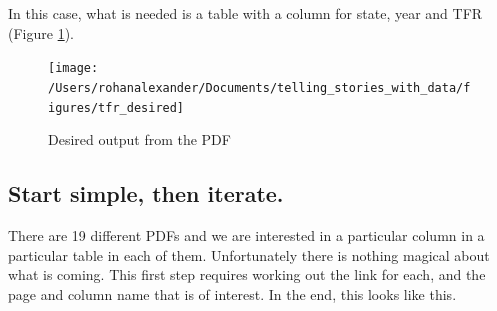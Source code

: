 \documentclass[
]{book}
\newenvironment{Shaded}{\begin{snugshade}}{\end{snugshade}}
\newcommand{\KeywordTok}[1]{\textcolor[rgb]{0.13,0.29,0.53}{\textbf{#1}}}
\newcommand{\NormalTok}[1]{#1}
\newcommand{\OperatorTok}[1]{\textcolor[rgb]{0.81,0.36,0.00}{\textbf{#1}}}
\newcommand{\StringTok}[1]{\textcolor[rgb]{0.31,0.60,0.02}{#1}}
\begin{document}
In this case, what is needed is a table with a column for state, year and TFR (Figure \ref{fig:tfrdesired}).

\begin{figure}
\texttt{[image: /Users/rohanalexander/Documents/telling\_stories\_with\_data/figures/tfr\_desired]} \caption{Desired output from the PDF}\label{fig:tfrdesired}
\end{figure}

\hypertarget{start-simple-then-iterate.}{%
\subsection{Start simple, then iterate.}\label{start-simple-then-iterate.}}

There are 19 different PDFs and we are interested in a particular column in a particular table in each of them. Unfortunately there is nothing magical about what is coming. This first step requires working out the link for each, and the page and column name that is of interest. In the end, this looks like this.

\begin{Shaded}
\end{Shaded}
\end{document}
